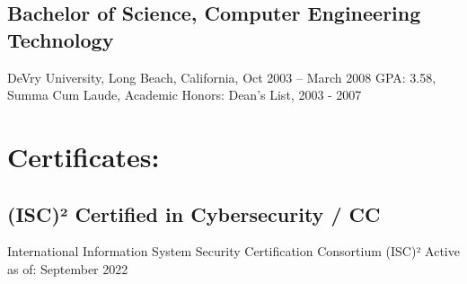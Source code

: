 \documentclass[letter,10pt]{article}
\begin{document}
\subsection*{Bachelor of Science, Computer Engineering Technology}
\label{sec:org310b857}
DeVry University, Long Beach, California, Oct 2003 – March 2008
GPA: 3.58, Summa Cum Laude, Academic Honors: Dean’s List, 2003 - 2007

\section*{Certificates:}
\label{sec:org3cfea22}
\subsection*{(ISC)² Certified in Cybersecurity / CC}
\label{sec:org2da3e05}
International Information System Security Certification Consortium (ISC)²
Active as of: September 2022
\end{document}
